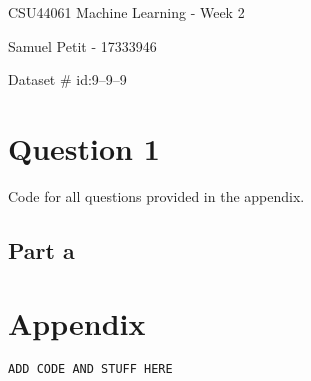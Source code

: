 \documentclass[10pt]{article}
\begin{document}
{\centering
    CSU44061 Machine Learning - Week 2
    \par
    Samuel Petit - 17333946
    \par
    Dataset \# id:9--9--9 
    \par
}
\section*{Question 1}
Code for all questions provided in the appendix.
\subsection*{Part a}

\section*{Appendix}
\begin{lstlisting}[language=Python]
ADD CODE AND STUFF HERE
\end{lstlisting}
\end{document}
